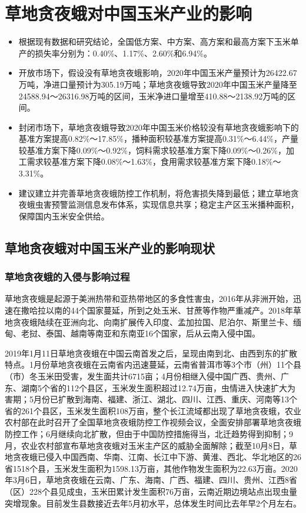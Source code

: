 \documentclass{progbookcn}
\begin{document}
\chapter{草地贪夜蛾对中国玉米产业的影响}
\begin{titledbox}{}
\begin{itemize}
  \item 根据现有数据和研究结论，全国低方案、中方案、高方案和最高方案下玉米单产的损失率分别为：0.40\%、1.17\%、2.60\%和6.94\%。
  \item 开放市场下，假设没有草地贪夜蛾影响，2020年中国玉米产量预计为26422.67万吨，净进口量预计为305.19万吨；草地贪夜蛾导致2020年中国玉米产量降至24588.94～26316.98万吨的区间，玉米净进口量增至410.88～2138.92万吨的区间。
  \item 封闭市场下，草地贪夜蛾导致2020年中国玉米价格较没有草地贪夜蛾影响下的基准方案提高0.82\%～17.85\%，播种面积较基准方案提高0.31\%～6.44\%，产量较基准方案下降0.09\%～0.92\%，饲料需求较基准方案下降0.09\%～0.26\%，加工需求较基准方案下降0.08\%～1.63\%，食用需求较基准方案下降0.18\%～3.31\%。
  \item 建议建立并完善草地贪夜蛾防控工作机制，将危害损失降到最低；建立草地贪夜蛾虫害预警监测信息发布体系，实现信息共享；稳定主产区玉米播种面积，保障国内玉米安全供给。
 \end{itemize}
\end{titledbox}

\section{草地贪夜蛾对中国玉米产业的影响现状}
\subsection{草地贪夜蛾的入侵与影响过程}
草地贪夜蛾是起源于美洲热带和亚热带地区的多食性害虫，2016年从非洲开始，迅速在撒哈拉以南的44个国家蔓延，所到之处玉米、甘蔗等作物严重减产。2018年草地贪夜蛾陆续在亚洲向北、向南扩展传入印度、孟加拉国、尼泊尔、斯里兰卡、缅甸、老挝、泰国、越南等南亚和东南亚16个国家，后从云南入侵中国。

2019年1月11日草地贪夜蛾在中国云南首发之后，呈现由南到北、由西到东的扩散特点。1月份草地贪夜蛾在云南省内迅速蔓延，云南省普洱市等3个市（州）11个县（市）冬玉米田受害，发生面共计6715亩；4月份相继入侵中国广西、贵州、广东、湖南5个省的112个县区，玉米发生面积超过12.74万亩，虫情进入快速扩大为害期；5月份已扩散到海南、福建、浙江、湖北、四川、江西、重庆、河南等13个省的261个县区，玉米发生面积108万亩，整个长江流域都出现了草地贪夜蛾，农业农村部在此时召开了全国草地贪夜蛾防控工作视频会议，全面安排部署草地贪夜蛾防控工作；6月继续向北扩散，但由于中国防控措施得当，北迁趋势得到抑制；9月，农业农村部宣布草地贪夜蛾对玉米主产区的威胁全面解除；截至10月8日，草地贪夜蛾已侵入中国西南、华南、江南、长江中下游、黄淮、西北、华北地区的26省1518个县，玉米发生面积为1598.13万亩，其他作物发生面积为22.63万亩。2020年3月6日，草地贪夜蛾在云南、广东、海南、广西、福建、四川、贵州、江西8省（区）228个县见成虫，玉米田累计发生面积76万亩，云南近期边境站点出现虫量突增现象。目前发生县数接近去年5月初水平，总体发生时间比去年早2个月左右。
\end{document}
